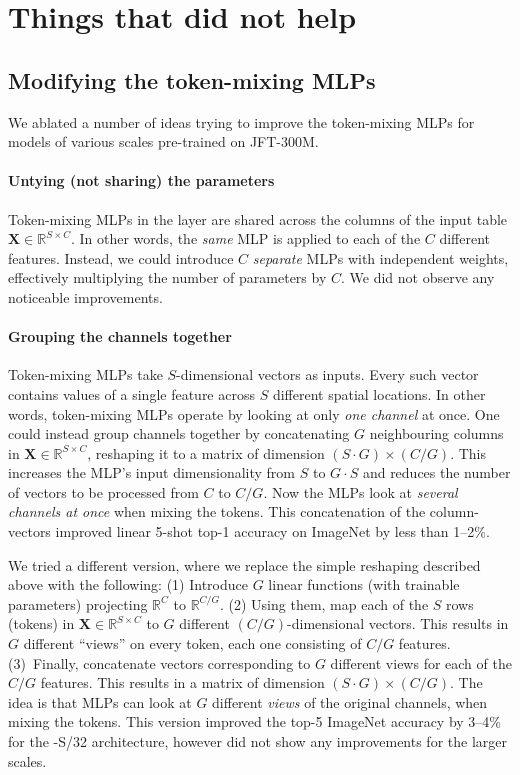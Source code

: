\section{Things that did not help}

\subsection{Modifying the token-mixing MLPs}
\label{appendix:did-not-work}

We ablated a number of ideas trying to improve the token-mixing MLPs for \name{} models of various scales pre-trained on JFT-300M.

\paragraph{Untying (not sharing) the parameters}

Token-mixing MLPs in the \name{} layer are shared across the columns of the input table $\mathbf{X}\in\mathbb{R}^{S\times C}$.
In other words, the \emph{same} MLP is applied to each of the $C$ different features.
Instead, we could introduce $C$ \emph{separate} MLPs with independent weights, effectively multiplying the number of parameters by $C$.
We did not observe any noticeable improvements.

\paragraph{Grouping the channels together}

Token-mixing MLPs take $S$-dimensional vectors as inputs.
Every such vector contains values of a single feature across $S$ different spatial locations.
In other words, token-mixing MLPs operate by looking at only \emph{one channel} at once.
One could instead group channels together by concatenating $G$ neighbouring columns in $\mathbf{X}\in\mathbb{R}^{S\times C}$, reshaping it to a matrix of dimension $(S\cdot G) \times (C / G)$.
This increases the MLP's input dimensionality from $S$ to $G \cdot S$ and reduces the number of vectors to be processed from $C$ to $C/G$.
Now the MLPs look at \emph{several channels at once} when mixing the tokens.
This concatenation of the column-vectors improved linear 5-shot top-1 accuracy on ImageNet by less than 1--2\%.

We tried a different version, where we replace the simple reshaping described above with the following:
(1) Introduce $G$ linear functions (with trainable parameters) projecting $\mathbb{R}^C$ to $\mathbb{R}^{C/G}$.
(2) Using them, map each of the $S$ rows (tokens) in $\mathbf{X}\in\mathbb{R}^{S\times C}$ to $G$ different $(C/G)$-dimensional vectors.
This results in $G$ different ``views'' on every token, each one consisting of $C/G$ features.
(3)~Finally, concatenate vectors corresponding to $G$ different views for each of the $C/G$ features. This results in a matrix of dimension $(S\cdot G) \times (C / G)$.
The idea is that MLPs can look at $G$ different \emph{views} of the original channels, when mixing the tokens.
This version improved the top-5 ImageNet accuracy by 3--4\% for the \name{}-S/32 architecture, however did not show any improvements for the larger scales.

